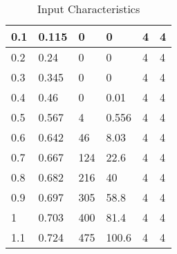 \begin{table}[!ht]
\begin{tabular}{|l|l|l|l|l|l|}
        0.1 & 0.115 & 0 & 0 & 4 & 4 \\ \hline
        0.2 & 0.24 & 0 & 0 & 4 & 4 \\ \hline
        0.3 & 0.345 & 0 & 0 & 4 & 4 \\ \hline
        0.4 & 0.46 & 0 & 0.01 & 4 & 4 \\ \hline
        0.5 & 0.567 & 4 & 0.556 & 4 & 4 \\ \hline
        0.6 & 0.642 & 46 & 8.03 & 4 & 4 \\ \hline
        0.7 & 0.667 & 124 & 22.6 & 4 & 4 \\ \hline
        0.8 & 0.682 & 216 & 40 & 4 & 4 \\ \hline
        0.9 & 0.697 & 305 & 58.8 & 4 & 4 \\ \hline
        1 & 0.703 & 400 & 81.4 & 4 & 4 \\ \hline
        1.1 & 0.724 & 475 & 100.6 & 4 & 4 \\ \hline
    \end{tabular}
    \caption{Input Characteristics}
\end{table}
